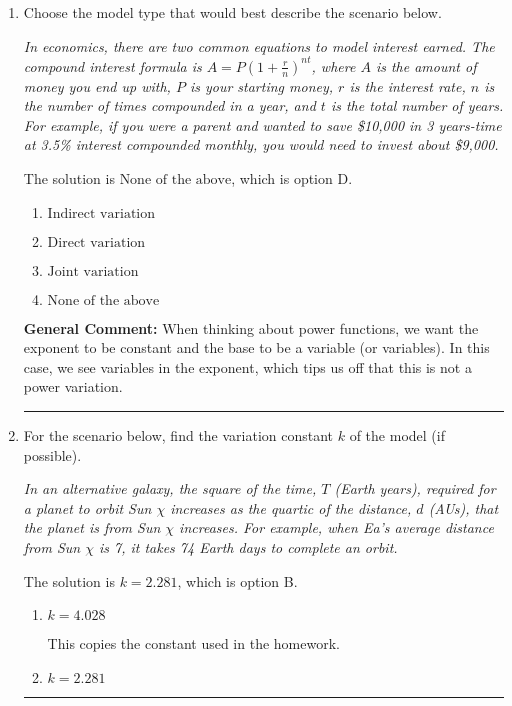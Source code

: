 \documentclass{extbook}[14pt]
\newcommand{\litem}[1]{\item #1

\rule{\textwidth}{0.4pt}}
\begin{document}
\begin{enumerate}\litem{
Choose the model type that would best describe the scenario below.

\begin{center}
    \textit{ In economics, there are two common equations to model interest earned. The compound interest formula is $A = P (1 + \frac{r}{n})^{nt}$, where $A$ is the amount of money you end up with, $P$ is your starting money, $r$ is the interest rate, $n$ is the number of times compounded in a year, and $t$ is the total number of years. For example, if you were a parent and wanted to save \$10,000 in 3 years-time at 3.5\% interest compounded monthly, you would need to invest about \$9,000. }
\end{center}
The solution is \( \text{None of the above} \), which is option D.\begin{enumerate}[label=\Alph*.]
\item \( \text{Indirect variation} \)


\item \( \text{Direct variation} \)


\item \( \text{Joint variation} \)


\item \( \text{None of the above} \)


\end{enumerate}

\textbf{General Comment:} When thinking about power functions, we want the exponent to be constant and the base to be a variable (or variables). In this case, we see variables in the exponent, which tips us off that this is not a power variation.
}
\litem{
For the scenario below, find the variation constant $k$ of the model (if possible).

\begin{center}
    \textit{ In an alternative galaxy, the square of the time, $T$ (Earth years), required for a planet to orbit Sun $\chi$ increases as the quartic of the distance, $d$ (AUs), that the planet is from Sun $\chi$ increases. For example, when Ea's average distance from Sun $\chi$ is 7, it takes 74 Earth days to complete an orbit. }
\end{center}
The solution is \( k = 2.281 \), which is option B.\begin{enumerate}[label=\Alph*.]
\item \( k = 4.028 \)

This copies the constant used in the homework.
\item \( k = 2.281 \)


\end{enumerate}}
\end{enumerate}
\end{document}
